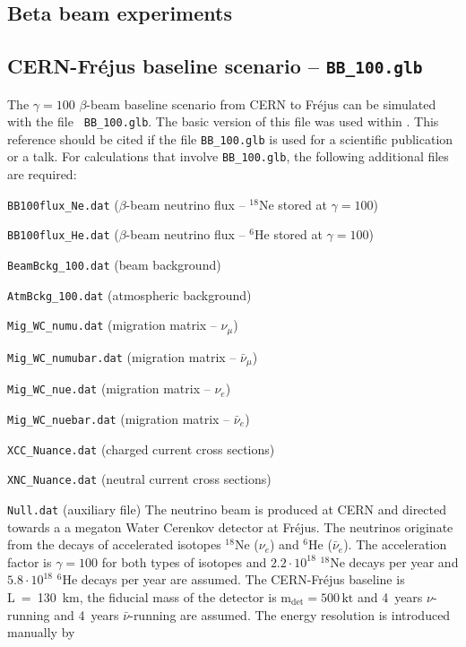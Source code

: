 \begin{appendix}
\section*{Beta beam experiments}
\subsection*{CERN-Fr\'{e}jus baseline scenario -- {\tt BB\_100.glb}}

The $\gamma=100$ $\beta$-beam baseline scenario from CERN to Fr\'{e}jus can be simulated with the file {\tt
BB\_100.glb}. The basic version of this file was used within \cite{Campagne:2006yx}. This reference
should be cited if the file {\tt BB\_100.glb} is used for a scientific publication or a talk. For calculations that
involve {\tt BB\_100.glb}, the following additional files are required: 
\bi
\item {\tt BB100flux\_Ne.dat} ($\beta$-beam neutrino flux -- $^{18}$Ne stored at $\gamma=100$)
\item {\tt BB100flux\_He.dat} ($\beta$-beam neutrino flux -- $^{6}$He stored at $\gamma=100$)
\item {\tt BeamBckg\_100.dat} (beam background)
\item {\tt AtmBckg\_100.dat} (atmospheric background)
\item {\tt Mig\_WC\_numu.dat} (migration matrix -- $\nu_\mu$)
\item {\tt Mig\_WC\_numubar.dat} (migration matrix -- $\bar{\nu}_\mu$)
\item {\tt Mig\_WC\_nue.dat} (migration matrix -- $\nu_e$)
\item {\tt Mig\_WC\_nuebar.dat} (migration matrix -- $\bar{\nu}_e$)
\item {\tt XCC\_Nuance.dat} (charged current cross sections)
\item {\tt XNC\_Nuance.dat} (neutral current cross sections)
\item {\tt Null.dat} (auxiliary file)
\ei
The neutrino beam is produced at CERN and directed towards a a megaton Water Cerenkov detector at Fr\'{e}jus. 
The neutrinos originate from the decays of accelerated isotopes $^{18}$Ne ($\nu_e$) and $^6$He ($\bar{\nu}_e$).
The acceleration factor is $\gamma=100$ for both types of isotopes and $2.2\cdot10^{18}$ $^{18}$Ne decays per
year and $5.8\cdot10^{18}$ $^{6}$He decays per year are assumed. The CERN-Fr\'{e}jus baseline is L~=~130~km, the
fiducial mass of the detector is $\mathrm{m_{det} = 500 \,kt}$ and 4~years $\nu$-running and 4~years
$\bar{\nu}$-running are assumed. The energy resolution is introduced manually by

\end{appendix}
